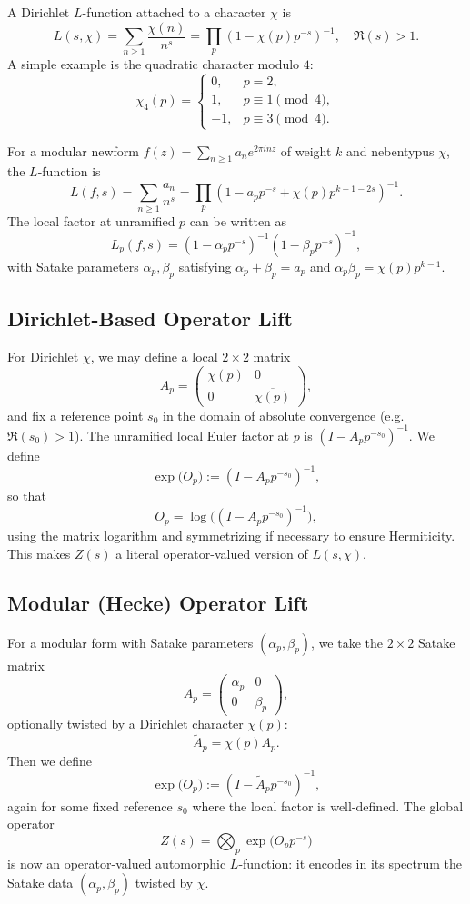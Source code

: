 \documentclass[11pt]{article}
\begin{document}
A Dirichlet $L$-function attached to a character $\chi$ is
\[
  L(s,\chi) = \sum_{n\ge 1} \frac{\chi(n)}{n^s}
  = \prod_{p} (1 - \chi(p) p^{-s})^{-1},
  \quad \Re(s) > 1.
\]
A simple example is the quadratic character modulo $4$:
\[
  \chi_4(p) = \begin{cases}
    0, & p=2,\\
    1, & p \equiv 1 \pmod 4,\\
    -1, & p \equiv 3 \pmod 4.
  \end{cases}
\]

For a modular newform $f(z) = \sum_{n\ge 1} a_n e^{2\pi i n z}$ of
weight $k$ and nebentypus $\chi$, the $L$-function is
\[
  L(f,s) = \sum_{n\ge 1} \frac{a_n}{n^s}
  = \prod_p (1 - a_p p^{-s} + \chi(p)p^{k-1-2s})^{-1}.
\]
The local factor at unramified $p$ can be written as
\[
  L_p(f,s) = (1 - \alpha_p p^{-s})^{-1}(1 - \beta_p p^{-s})^{-1},
\]
with Satake parameters $\alpha_p,\beta_p$ satisfying
$\alpha_p + \beta_p = a_p$ and $\alpha_p \beta_p = \chi(p)p^{k-1}$.

\subsection{Dirichlet-Based Operator Lift}

For Dirichlet $\chi$, we may define a local $2 \times 2$ matrix
\[
  A_p = \begin{pmatrix}
    \chi(p) & 0\\
    0 & \overline{\chi(p)}
  \end{pmatrix},
\]
and fix a reference point $s_0$ in the domain of absolute convergence
(e.g.\ $\Re(s_0) > 1$). The unramified local Euler factor at $p$ is
$(I - A_p p^{-s_0})^{-1}$. We define
\[
  \exp\bigl(O_p\bigr) := (I - A_p p^{-s_0})^{-1},
\]
so that
\[
  O_p = \log\bigl( (I - A_p p^{-s_0})^{-1}\bigr),
\]
using the matrix logarithm and symmetrizing if necessary to ensure
Hermiticity. This makes $Z(s)$ a literal operator-valued version of
$L(s,\chi)$.

\subsection{Modular (Hecke) Operator Lift}

For a modular form with Satake parameters $(\alpha_p,\beta_p)$, we take
the $2 \times 2$ Satake matrix
\[
  A_p = \begin{pmatrix}
    \alpha_p & 0\\
    0 & \beta_p
  \end{pmatrix},
\]
optionally twisted by a Dirichlet character $\chi(p)$:
\[
  \widetilde{A}_p = \chi(p) A_p.
\]
Then we define
\[
  \exp\bigl(O_p\bigr) := (I - \widetilde{A}_p p^{-s_0})^{-1},
\]
again for some fixed reference $s_0$ where the local factor is
well-defined. The global operator
\[
  Z(s) = \bigotimes_p \exp\bigl(O_p p^{-s}\bigr)
\]
is now an operator-valued automorphic $L$-function: it encodes in its
spectrum the Satake data $(\alpha_p,\beta_p)$ twisted by $\chi$.
\end{document}
